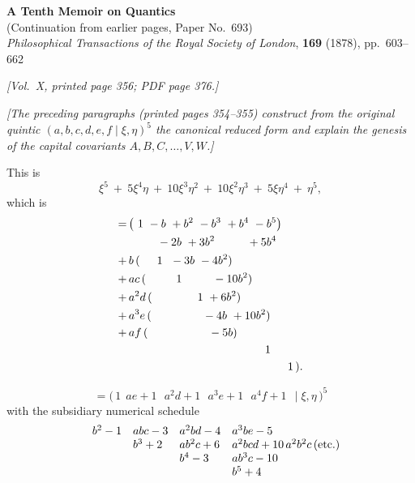\documentclass[11pt]{article}
\begin{document}
\begin{center}
\large\textbf{A Tenth Memoir on Quantics} \\[2pt]
\small (Continuation from earlier pages, Paper No.~693) \\[2pt]
\small \textit{Philosophical Transactions of the Royal Society of London}, \textbf{169} (1878), pp.~603--662
\end{center}

\bigskip

\noindent\textit{[Vol.~X, printed page 356; PDF page 376.]}

\medskip

\noindent\textit{[The preceding paragraphs (printed pages 354--355) construct from the original quintic
$(a,b,c,d,e,f \mid \xi,\eta)^{5}$ the canonical reduced form and explain the genesis of the capital
covariants $A, B, C, \ldots, V, W$.]}

\medskip

This is
\[
\xi^{5}\ +\ 5\xi^{4}\eta\ +\ 10\xi^{3}\eta^{2}\ +\ 10\xi^{2}\eta^{3}\ +\ 5\xi\eta^{4}\ +\ \eta^{5},
\]
which is
{\small
\begin{align*}
=\,&\bigl(\ 1\ -b\ +b^{2}\ -b^{3}\ +b^{4}\ -b^{5}\bigr) \\
&\hspace{2.5em} -2b\ +3b^{2}\ \phantom{-3b^{3}}\ +5b^{4} \\
+\,&b\,(\ \phantom{1}\ \ 1\ \ -3b\ -4b^{2}) \\
+\,&ac\,(\ \phantom{1}\ \ \phantom{1}\ \ 1\ \ \phantom{-3b}\ -10b^{2}) \\
+\,&a^{2}d\,(\ \phantom{1}\ \phantom{1}\ \phantom{1}\ \phantom{1}\ \ 1\ +6b^{2}) \\
+\,&a^{3}e\,(\ \phantom{1}\ \phantom{1}\ \phantom{1}\ \phantom{1}\ \phantom{1}\ -4b\ +10b^{2}) \\
+\,&af\,(\ \phantom{1}\ \phantom{1}\ \phantom{1}\ \phantom{1}\ \phantom{1}\ \phantom{1}\ -5b) \\
&\hspace{12em} 1 \\
&\hspace{14em} 1\,).
\end{align*}
}

\medskip

\[
=\bigl(\,1\ \ ae+1\ \ \ a^{2}d+1\ \ \ a^{3}e+1\ \ \ a^{4}f+1\ \ \mid \xi,\eta\,\bigr)^{5}
\]
with the subsidiary numerical schedule
\[
\begin{array}{l@{\quad}l@{\quad}l@{\quad}l@{\quad}l}
 & b^{2}-1 & abc-3 & a^{2}bd-4 & a^{3}be-5 \\
 & & b^{3}+2 & ab^{2}c+6 & a^{2}bcd+10\,a^{2}b^{2}c\,(\text{etc.}) \\
 & & & b^{4}-3 & ab^{3}c-10 \\
 & & & & b^{5}+4
\end{array}
\]
\end{document}
